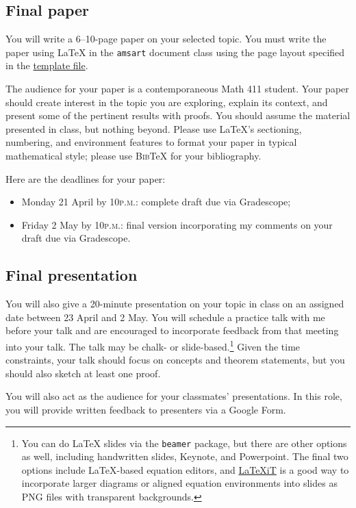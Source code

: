 \documentclass[11pt]{amsart}
\numberwithin{equation}{section} %
\theoremstyle{plain}
\theoremstyle{definition}
\theoremstyle{remark}
\theoremstyle{plain}
\begin{document}
\subsection*{Final paper}
You will write a 6--10-page paper on your selected topic.  You must write the paper using \LaTeX{} in the \texttt{amsart} document class using the page layout specified in the \href{https://kyleormsby.github.io/files/411/template.tex}{template file}.

The audience for your paper is a contemporaneous Math 411 student.  Your paper should create interest in the topic you are exploring, explain its context, and present some of the pertinent results with proofs. You should assume the material presented in class, but nothing beyond.  Please use \LaTeX's sectioning, numbering, and environment features to format your paper in typical mathematical style; please use \textsc{Bib}\TeX{} for your bibliography.

Here are the deadlines for your paper:
\begin{itemize}
\item Monday 21 April by 10\textsc{p.m.}: complete draft due via Gradescope;
\item Friday 2 May by 10\textsc{p.m.}: final version incorporating my comments on your draft due via Gradescope.
\end{itemize}

\subsection*{Final presentation}
You will also give a 20-minute presentation on your topic in class on an assigned date between 23 April and 2 May.  You will schedule a practice talk with me before your talk and are encouraged to incorporate feedback from that meeting into your talk.  The talk may be chalk- or slide-based.\footnote{You can do \LaTeX{} slides via the \texttt{beamer} package, but there are other options as well, including handwritten slides, Keynote, and Powerpoint. The final two options include \LaTeX-based equation editors, and \href{https://www.chachatelier.fr/latexit/}{\LaTeX{}iT} is a good way to incorporate larger diagrams or aligned equation environments into slides as PNG files with transparent backgrounds.}  Given the time constraints, your talk should focus on concepts and theorem statements, but you should also sketch at least one proof.

You will also act as the audience for your classmates' presentations.  In this role, you will provide written feedback to presenters via a Google Form.
\end{document}
